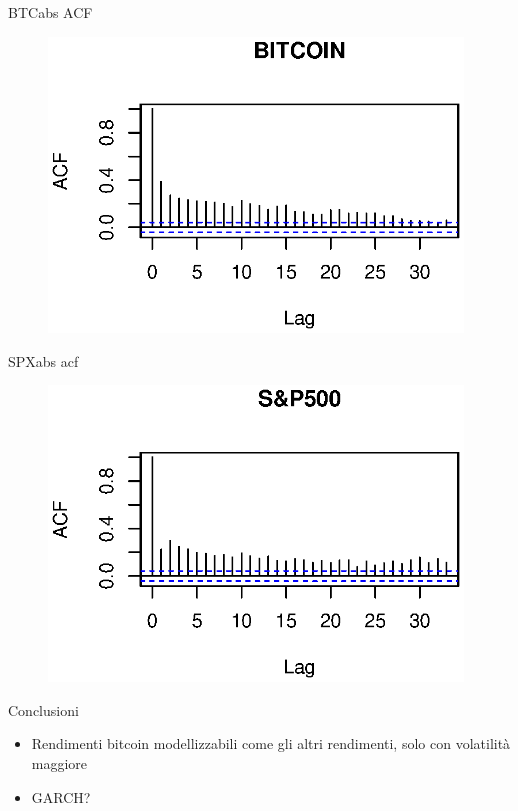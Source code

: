 \documentclass{beamer}
\begin{document}
\begin{frame}{BTCabs ACF}
	\begin{figure}[linewidth=250mm]	
		\includegraphics[width=110mm]{BTCabsacf.eps}
	\end{figure}
\end{frame}
\begin{frame}{SPXabs acf}
	\begin{figure}[b]	
		\includegraphics[width=110mm]{SPabsacf.eps}
	\end{figure}
\end{frame}



\begin{frame}{Conclusioni}
	\begin{itemize}
		\item Rendimenti bitcoin modellizzabili come gli altri rendimenti, solo con volatilità maggiore
		\item GARCH?
	\end{itemize}
\end{frame}
\end{document}
